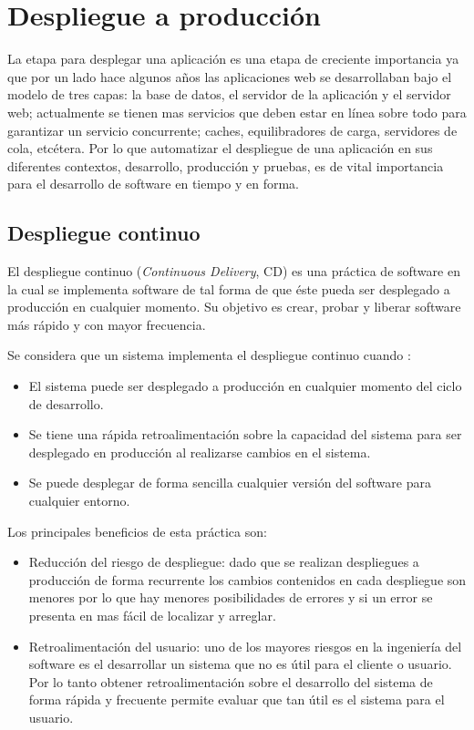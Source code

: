 \chapter{Despliegue a producción}

La etapa para desplegar una aplicación es una etapa de creciente importancia ya
que por un lado hace algunos años las aplicaciones web se desarrollaban bajo el
modelo de tres capas: la base de datos, el servidor de la aplicación y el servidor
web; actualmente se tienen mas servicios que deben estar en línea sobre todo para
garantizar un servicio concurrente; caches, equilibradores de carga, servidores
de cola, etcétera. Por lo que automatizar el despliegue de una aplicación en sus
diferentes contextos, desarrollo, producción y pruebas, es de vital importancia
para el desarrollo de software en tiempo y en forma.

\section{Despliegue continuo}

El despliegue continuo (\textit{Continuous Delivery}, CD) es una práctica de software
en la cual se implementa software de tal forma de que éste pueda ser desplegado a
producción en cualquier momento\cite{27_martin_fowler_cd}. Su objetivo es crear,
probar y liberar software más rápido y con mayor frecuencia.

\vspace{2.5mm}

Se considera que un sistema implementa el despliegue continuo cuando
\cite{27_martin_fowler_cd}:
\begin{itemize}
\item El sistema puede ser desplegado a producción en cualquier momento del
  ciclo de desarrollo.
\item Se tiene una rápida retroalimentación sobre la capacidad del sistema
  para ser desplegado en producción al realizarse cambios en el sistema.
\item Se puede desplegar de forma sencilla cualquier versión del software para
  cualquier entorno.
\end{itemize}

Los principales beneficios de esta práctica son:
\begin{itemize}
\item Reducción del riesgo de despliegue: dado que se realizan despliegues
  a producción de forma recurrente los cambios contenidos en cada despliegue
  son menores por lo que hay menores posibilidades de errores y si un error
  se presenta en mas fácil de localizar y arreglar.
\item Retroalimentación del usuario: uno de los mayores riesgos en la ingeniería
  del software es el desarrollar un sistema que no es útil para el cliente o usuario.
  Por lo tanto obtener retroalimentación sobre el desarrollo del sistema de forma
  rápida y frecuente permite evaluar que tan útil es el sistema para el usuario.
\end{itemize}

